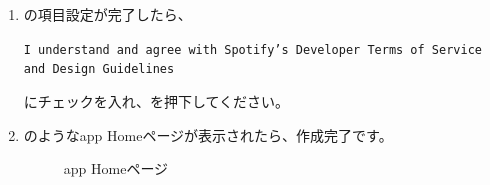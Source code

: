 \begin{enumerate}
                \newpage
                \item {}の項目設定が完了したら、
                \label{item:spotify8}
                    \begin{screen}
                        \texttt{I understand and agree with Spotify's Developer Terms of Service and Design Guidelines}
                    \end{screen}
                    にチェックを入れ、を押下してください。

                \item {}のようなapp Homeページが表示されたら、作成完了です。
                \label{item:spotify9}
                    \begin{figure}[htbp]
                        \centering
                        \caption{app Homeページ}
                        \label{img:spotify7}
                    \end{figure}
            \end{enumerate}

        \newpage
